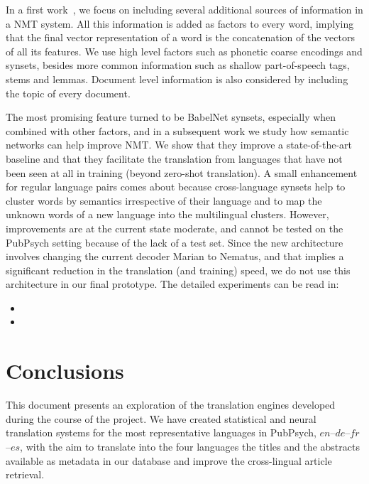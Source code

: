 \documentclass[a4paper,11pt]{article}
\newcommand{\en}{$en$}
\newcommand{\es}{$es$}
\newcommand{\fr}{$fr$}
\newcommand{\de}{$de$}
\begin{document}
In a first work~\cite{espanaVanGenabith:IWSLT:2017}, we focus on including several additional sources of information in a NMT system. All this information is added as factors to every word, implying that the final vector representation of a word is the concatenation of the vectors of all its features. We use high level factors such as phonetic coarse encodings and synsets, besides more common information such as shallow part-of-speech tags, stems and lemmas. Document level information is also considered by including the topic of every document. 

The most promising feature turned to be BabelNet synsets, especially when combined with other factors, and in a subsequent work we study how semantic networks can help improve NMT. We show that they improve a state-of-the-art baseline and that they facilitate the translation from languages that have not been seen at all in training (beyond zero-shot translation). A small enhancement for regular language pairs comes about because cross-language synsets help to cluster words by semantics irrespective of their language and to map the unknown words of a new language into the multilingual clusters. However, improvements are at the current state moderate, and cannot be tested on the PubPsych setting because of the lack of a test set. Since the new architecture involves changing the current decoder Marian to Nematus, and that implies a significant reduction in the translation (and training) speed, we do not use this architecture in our final prototype. The detailed experiments can be read in:

\begin{itemize}
 \item[\cite{espanaVanGenabith:IWSLT:2017}] 
 \item[\cite{espanaVanGenabith:LREC:2018}] 
\end{itemize}

\section{Conclusions}
\label{s:conclusions}

This document presents an exploration of the translation engines developed during the course of the project. We have created statistical and neural translation systems for the most representative languages in PubPsych, \en--\de--\fr--\es, with the aim to translate into the four languages the titles and the abstracts available as metadata in our database and improve the cross-lingual article retrieval.
\end{document}
